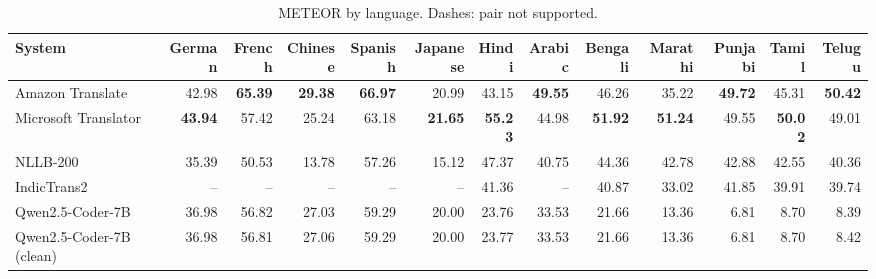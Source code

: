 \begin{table}[t]
\centering
\caption{METEOR by language. Dashes: pair not supported.\label{tab:meteor_lang}}
\begin{tabular}{lrrrrrrrrrrrr}
\toprule
System & German & French & Chinese & Spanish & Japanese & Hindi & Arabic & Bengali & Marathi & Punjabi & Tamil & Telugu \\
\midrule
Amazon Translate & 42.98 & \textbf{65.39} & \textbf{29.38} & \textbf{66.97} & 20.99 & 43.15 & \textbf{49.55} & 46.26 & 35.22 & \textbf{49.72} & 45.31 & \textbf{50.42} \\
Microsoft Translator & \textbf{43.94} & 57.42 & 25.24 & 63.18 & \textbf{21.65} & \textbf{55.23} & 44.98 & \textbf{51.92} & \textbf{51.24} & 49.55 & \textbf{50.02} & 49.01 \\
NLLB-200 & 35.39 & 50.53 & 13.78 & 57.26 & 15.12 & 47.37 & 40.75 & 44.36 & 42.78 & 42.88 & 42.55 & 40.36 \\
IndicTrans2 & -- & -- & -- & -- & -- & 41.36 & -- & 40.87 & 33.02 & 41.85 & 39.91 & 39.74 \\
Qwen2.5-Coder-7B & 36.98 & 56.82 & 27.03 & 59.29 & 20.00 & 23.76 & 33.53 & 21.66 & 13.36 & 6.81 & 8.70 & 8.39 \\
Qwen2.5-Coder-7B (clean) & 36.98 & 56.81 & 27.06 & 59.29 & 20.00 & 23.77 & 33.53 & 21.66 & 13.36 & 6.81 & 8.70 & 8.42 \\
\bottomrule
\end{tabular}
\end{table}

